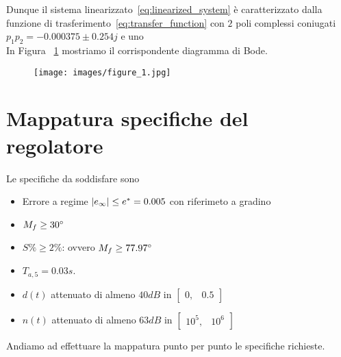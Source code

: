 \documentclass[a4paper, 11pt]{article}
\begin{document}
Dunque il sistema linearizzato~\eqref{eq:linearized_system} è caratterizzato dalla funzione di trasferimento~\eqref{eq:transfer_function} con $2$ poli complessi coniugati $p_1p_2 = -0.000375 \pm 0.254j $ e uno\\ In Figura ~\ref{Figura1} mostriamo il corrispondente diagramma di Bode. 
\begin{figure}[H]
    \centering
\texttt{[image: images/figure\_1.jpg]}
    \caption{}
    \label{Figura1}
\end{figure}

\section{Mappatura specifiche del regolatore}
\label{sec:specifications}

Le specifiche da soddisfare sono
\begin{itemize}
	\item[1)] Errore a regime $\space |e_{\infty}| \le e^* = 0.005 $ con riferimeto a gradino
	\\
	\item[2)] $M_f \ge 30\degree$ 
 \\
	\item[3)] $S\%\ge 2\%$: ovvero $M_f \ge 77.97\degree$
 \\
	\item[4)] $T_{a,5} = 0.03s$. 
 \\
	\item[5)]$d(t)$ attenuato di almeno $40dB$ in $\begin{bmatrix}
	    0 , & 0.5
	\end{bmatrix}$
 \\
	\item[6)]$n(t)$ attenuato di almeno $63dB$ in $\begin{bmatrix}
	    10^5 , & 10^6
	\end{bmatrix}$
\end{itemize}
%
Andiamo ad effettuare la mappatura punto per punto le specifiche richieste.
\end{document}

